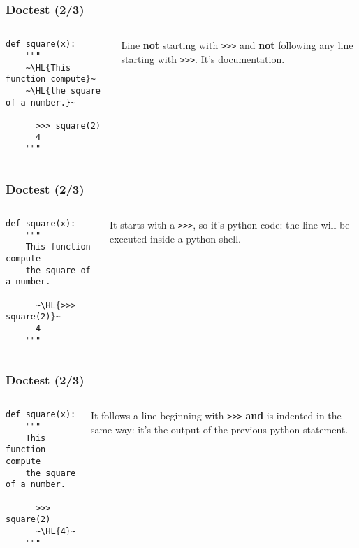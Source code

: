 \documentclass[english,serif,mathserif,xcolor=pdftex,dvipsnames,table]{beamer}
\begin{document}
\begin{frame}[fragile]
  \frametitle{Doctest (2/3)}
  \begin{columns}[t]
    \begin{column}{0.6\textwidth}
  \begin{lstlisting}
def square(x):
    """
    ~\HL{This function compute}~
    ~\HL{the square of a number.}~

      >>> square(2)
      4
    """
  \end{lstlisting}
\end{column}
\begin{column}{0.4\textwidth}
  Line \textbf{not} starting with \texttt{>>>} and \textbf{not}
  following any line starting with \texttt{>>>}. It's documentation.
\end{column}
\end{columns}
\end{frame}

\begin{frame}[fragile]
  \frametitle{Doctest (2/3)}
\begin{columns}[t]
  \begin{column}{0.6\textwidth}
  \begin{lstlisting}
def square(x):
    """
    This function compute
    the square of a number.

      ~\HL{>>> square(2)}~
      4
    """
  \end{lstlisting}
\end{column}
\begin{column}{0.4\textwidth}
  It starts with a \texttt{>>>}, so it's python code: the line will be
  executed inside a python shell.
\end{column}
\end{columns}
\end{frame}

\begin{frame}[fragile]
  \frametitle{Doctest (2/3)}
\begin{columns}[t]
  \begin{column}{0.6\textwidth}
  \begin{lstlisting}
def square(x):
    """
    This function compute
    the square of a number.

      >>> square(2)
      ~\HL{4}~
    """
  \end{lstlisting}
\end{column}
\begin{column}{0.4\textwidth}
  It follows a line beginning with \texttt{>>>} \textbf{and} is
  indented in the same way: it's the output of the previous python
  statement.
\end{column}
\end{columns}
\end{frame}
\end{document}
